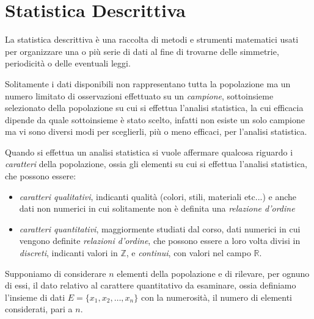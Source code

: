 \documentclass[a4paper,12pt, oneside]{book}
\newcommand{\numberset}{\mathbb}
\newcommand{\Z}{\numberset{Z}}
\newcommand{\R}{\numberset{R}}
\begin{document}
\chapter{Statistica Descrittiva}
La statistica descrittiva è una raccolta di metodi e strumenti matematici usati per organizzare una o più serie di dati
al fine di trovarne delle simmetrie, periodicità o delle eventuali leggi.

Solitamente i dati disponibili non rappresentano tutta la popolazione ma un numero limitato 
di osservazioni effettuato su un \emph{campione}, sottoinsieme selezionato della popolazione su cui si effettua
l'analisi statistica, la cui efficacia dipende da quale sottoinsieme è stato scelto, infatti non esiste 
un solo campione ma vi sono diversi modi per sceglierli, più o meno efficaci, per l'analisi statistica.

Quando si effettua un analisi statistica si vuole affermare qualcosa riguardo i \emph{caratteri} della popolazione,
ossia gli elementi su cui si effettua l'analisi statistica, che possono essere:
\begin{itemize}
    \item \emph{caratteri qualitativi}, indicanti qualità (colori, stili, materiali etc...) e anche dati non numerici
             in cui solitamente non è definita una \textit{relazione d'ordine}
    \item \emph{caratteri quantitativi}, maggiormente studiati dal corso, dati numerici 
          in cui vengono definite \emph{relazioni d'ordine}, che possono essere a loro volta divisi in
          \emph{discreti}, indicanti valori in $\Z$, e \emph{continui}, con valori nel campo $\R$.
\end{itemize}
Supponiamo di considerare $n$ elementi della popolazione e di rilevare, per ognuno di essi,
il dato relativo al carattere quantitativo da esaminare, ossia definiamo l'insieme di dati
$E=\{x_1, x_2, \dots, x_n\}$ con la numerosità, il numero di elementi considerati, pari a $n$.
\end{document}
